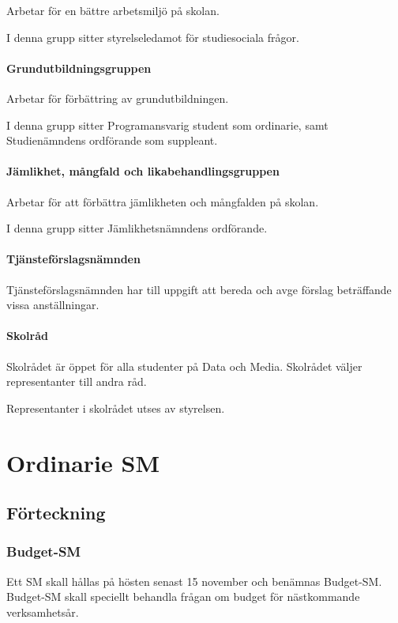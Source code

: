 \documentclass{dgovdoc}
\begin{document}
Arbetar för en bättre arbetsmiljö på skolan.

I denna grupp sitter styrelseledamot för studiesociala
frågor.

\paragraph{Grundutbildningsgruppen}

Arbetar för förbättring av grundutbildningen.

I denna grupp sitter Programansvarig student som ordinarie, samt Studienämndens
ordförande som suppleant.

\paragraph{Jämlikhet, mångfald och likabehandlingsgruppen}

Arbetar för att förbättra jämlikheten och mångfalden på skolan.

I denna grupp sitter Jämlikhetsnämndens ordförande.

\paragraph{Tjänsteförslagsnämnden}

Tjänsteförslagsnämnden har till uppgift att bereda och avge förslag beträffande
vissa anställningar.

\paragraph{Skolråd}
Skolrådet är öppet för alla studenter på Data och Media. Skolrådet väljer representanter till andra råd.

Representanter i skolrådet utses av styrelsen.

\section{Ordinarie SM}

\subsection{Förteckning}

\subsubsection{Budget-SM}

Ett SM skall hållas på hösten senast 15 november och benämnas Budget-SM.
Budget-SM skall speciellt behandla frågan om budget för nästkommande
verksamhetsår.
\end{document}

